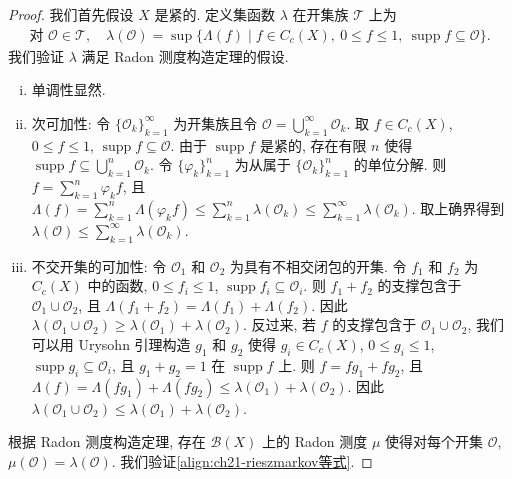 \documentclass[../../main.tex]{subfiles}
\begin{document}
\begin{proof}
我们首先假设 $X$ 是紧的. 定义集函数 $\lambda$ 在开集族 $\mathcal{T}$ 上为
\begin{align*}
\text{对 }\mathcal{O}\in\mathcal{T},\quad\lambda(\mathcal{O})=\sup\{\Lambda(f)\mid f\in C_{c}(X),\ 0\leqslant f\leqslant 1,\ \operatorname{supp}f\subseteq\mathcal{O}\}.
\end{align*}
我们验证 $\lambda$ 满足 Radon 测度构造定理的假设.
\begin{enumerate}[(i)]
\item 单调性显然.
\item 次可加性: 令 $\{\mathcal{O}_{k}\}_{k=1}^{\infty}$ 为开集族且令 $\mathcal{O}=\bigcup_{k=1}^{\infty}\mathcal{O}_{k}$. 取 $f\in C_{c}(X)$, $0\leqslant f\leqslant 1$, $\operatorname{supp}f\subseteq\mathcal{O}$. 由于 $\operatorname{supp}f$ 是紧的, 存在有限 $n$ 使得 $\operatorname{supp}f\subseteq\bigcup_{k=1}^{n}\mathcal{O}_{k}$. 令 $\{\varphi_{k}\}_{k=1}^{n}$ 为从属于 $\{\mathcal{O}_{k}\}_{k=1}^{n}$ 的单位分解. 则 $f=\sum_{k=1}^{n}\varphi_{k}f$, 且 $\Lambda(f)=\sum_{k=1}^{n}\Lambda(\varphi_{k}f)\leqslant\sum_{k=1}^{n}\lambda(\mathcal{O}_{k})\leqslant\sum_{k=1}^{\infty}\lambda(\mathcal{O}_{k})$. 取上确界得到 $\lambda(\mathcal{O})\leqslant\sum_{k=1}^{\infty}\lambda(\mathcal{O}_{k})$.
\item 不交开集的可加性: 令 $\mathcal{O}_{1}$ 和 $\mathcal{O}_{2}$ 为具有不相交闭包的开集. 令 $f_{1}$ 和 $f_{2}$ 为 $C_{c}(X)$ 中的函数, $0\leqslant f_{i}\leqslant 1$, $\operatorname{supp}f_{i}\subseteq\mathcal{O}_{i}$. 则 $f_{1}+f_{2}$ 的支撑包含于 $\mathcal{O}_{1}\cup\mathcal{O}_{2}$, 且 $\Lambda(f_{1}+f_{2})=\Lambda(f_{1})+\Lambda(f_{2})$. 因此 $\lambda(\mathcal{O}_{1}\cup\mathcal{O}_{2})\geqslant\lambda(\mathcal{O}_{1})+\lambda(\mathcal{O}_{2})$. 反过来, 若 $f$ 的支撑包含于 $\mathcal{O}_{1}\cup\mathcal{O}_{2}$, 我们可以用 Urysohn 引理构造 $g_{1}$ 和 $g_{2}$ 使得 $g_{i}\in C_{c}(X)$, $0\leqslant g_{i}\leqslant 1$, $\operatorname{supp}g_{i}\subseteq\mathcal{O}_{i}$, 且 $g_{1}+g_{2}=1$ 在 $\operatorname{supp}f$ 上. 则 $f=f g_{1}+f g_{2}$, 且 $\Lambda(f)=\Lambda(f g_{1})+\Lambda(f g_{2})\leqslant\lambda(\mathcal{O}_{1})+\lambda(\mathcal{O}_{2})$. 因此 $\lambda(\mathcal{O}_{1}\cup\mathcal{O}_{2})\leqslant\lambda(\mathcal{O}_{1})+\lambda(\mathcal{O}_{2})$.
\end{enumerate}
根据 Radon 测度构造定理, 存在 $\mathcal{B}(X)$ 上的 Radon 测度 $\mu$ 使得对每个开集 $\mathcal{O}$, $\mu(\mathcal{O})=\lambda(\mathcal{O})$. 我们验证\eqref{align:ch21-rieszmarkov等式}.


\end{proof}
\end{document}
